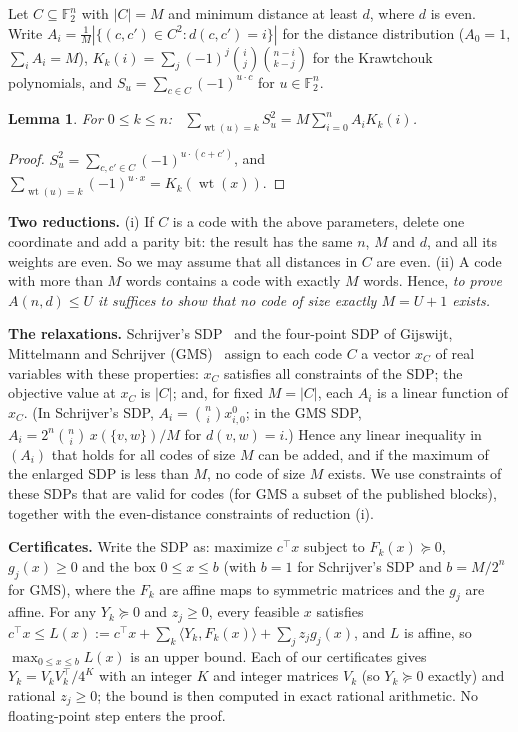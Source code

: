 \documentclass[11pt]{article}
\newtheorem{lemma}[theorem]{Lemma}
\theoremstyle{remark}
\newcommand{\F}{\mathbb{F}_2}
\DeclareMathOperator{\wt}{wt}
\begin{document}
Let $C\subseteq\F^n$ with $|C|=M$ and minimum distance at least $d$, where $d$ is even.
Write $A_i=\frac1M|\{(c,c')\in C^2: d(c,c')=i\}|$ for the distance distribution ($A_0=1$, $\sum_i A_i=M$),
$K_k(i)=\sum_j(-1)^j\binom ij\binom{n-i}{k-j}$ for the Krawtchouk polynomials, and
$S_u=\sum_{c\in C}(-1)^{u\cdot c}$ for $u\in\F^n$.

\begin{lemma}\label{lem:shell}
For $0\le k\le n$: \ $\sum_{\wt(u)=k} S_u^2 = M\sum_{i=0}^n A_i K_k(i)$.
\end{lemma}
\begin{proof}
$S_u^2=\sum_{c,c'\in C}(-1)^{u\cdot(c+c')}$, and $\sum_{\wt(u)=k}(-1)^{u\cdot x}=K_k(\wt(x))$.
\end{proof}

\textbf{Two reductions.} (i) If $C$ is a code with the above parameters, delete one coordinate and add a parity bit:
the result has the same $n$, $M$ and $d$, and all its weights are even. So we may assume that all
distances in $C$ are even. (ii) A code with more than $M$ words contains a code with exactly $M$ words.
Hence, \emph{to prove $A(n,d)\le U$ it suffices to show that no code of size exactly $M=U+1$ exists.}

\textbf{The relaxations.} Schrijver's SDP~\cite{Sch} and the four-point SDP of Gijswijt, Mittelmann and
Schrijver (GMS)~\cite{GMS} assign to each code $C$ a vector $x_C$ of real variables with these properties:
$x_C$ satisfies all constraints of the SDP; the objective value at $x_C$ is $|C|$; and, for fixed $M=|C|$,
each $A_i$ is a linear function of $x_C$. (In Schrijver's SDP, $A_i=\binom ni x^{0}_{i,0}$; in the GMS SDP,
$A_i=2^n\binom ni\,x(\{v,w\})/M$ for $d(v,w)=i$.) Hence any linear inequality in $(A_i)$ that holds for all
codes of size $M$ can be added, and if the maximum of the enlarged SDP is less than $M$, no code of size $M$ exists.
We use constraints of these SDPs that are valid for codes (for GMS a subset of the published blocks), together with
the even-distance constraints of reduction (i).

\textbf{Certificates.} Write the SDP as: maximize $c^\top x$ subject to $F_k(x)\succeq0$, $g_j(x)\ge0$ and the box
$0\le x\le b$ (with $b=1$ for Schrijver's SDP and $b=M/2^n$ for GMS), where the $F_k$ are affine maps to symmetric matrices and the $g_j$ are affine. For any
$Y_k\succeq0$ and $z_j\ge0$, every feasible $x$ satisfies
$c^\top x\le L(x):=c^\top x+\sum_k\langle Y_k,F_k(x)\rangle+\sum_j z_j g_j(x)$, and $L$ is affine,
so $\max_{0\le x\le b}L(x)$ is an upper bound. Each of our certificates gives $Y_k=V_kV_k^\top/4^K$ with an
integer $K$ and integer matrices $V_k$ (so $Y_k\succeq0$ exactly) and rational $z_j\ge0$; the bound is then computed in exact rational
arithmetic. No floating-point step enters the proof.
\end{document}
